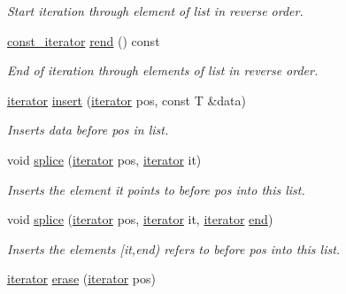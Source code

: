 \begin{DoxyCompactItemize}
\begin{DoxyCompactList}\small\item\em Start iteration through element of list in reverse order. \end{DoxyCompactList}\item 
\mbox{\hyperlink{classsymlist_af15c0ca931299054f83d17a1580a5159}{const\+\_\+iterator}} \mbox{\hyperlink{classsymlist_a42379ebaa07ddb1160d785fec701712d}{rend}} () const
\begin{DoxyCompactList}\small\item\em End of iteration through elements of list in reverse order. \end{DoxyCompactList}\item 
\mbox{\hyperlink{classsymlist_a66045fbe3d98975e5537092ede8b50df}{iterator}} \mbox{\hyperlink{classsymlist_a8b3327b8a33b180bf1eb802856f755c3}{insert}} (\mbox{\hyperlink{classsymlist_a66045fbe3d98975e5537092ede8b50df}{iterator}} pos, const T \&data)
\begin{DoxyCompactList}\small\item\em Inserts {\ttfamily data} before {\ttfamily pos} in list. \end{DoxyCompactList}\item 
void \mbox{\hyperlink{classsymlist_ac2bd4d9db62ea6a3282662c62a97c3b2}{splice}} (\mbox{\hyperlink{classsymlist_a66045fbe3d98975e5537092ede8b50df}{iterator}} pos, \mbox{\hyperlink{classsymlist_a66045fbe3d98975e5537092ede8b50df}{iterator}} it)
\begin{DoxyCompactList}\small\item\em Inserts the element {\ttfamily it} points to before {\ttfamily pos} into this list. \end{DoxyCompactList}\item 
void \mbox{\hyperlink{classsymlist_a27889c85e97c1e8dec7a871987a12b29}{splice}} (\mbox{\hyperlink{classsymlist_a66045fbe3d98975e5537092ede8b50df}{iterator}} pos, \mbox{\hyperlink{classsymlist_a66045fbe3d98975e5537092ede8b50df}{iterator}} it, \mbox{\hyperlink{classsymlist_a66045fbe3d98975e5537092ede8b50df}{iterator}} \mbox{\hyperlink{classsymlist_a7283589fa01f79d722f8256d7a6a7883}{end}})
\begin{DoxyCompactList}\small\item\em Inserts the elements {\ttfamily \mbox{[}it,end)} refers to before {\ttfamily pos} into this list. \end{DoxyCompactList}\item 
\mbox{\hyperlink{classsymlist_a66045fbe3d98975e5537092ede8b50df}{iterator}} \mbox{\hyperlink{classsymlist_a75fc1fc7db7b20cc430ddb8577608904}{erase}} (\mbox{\hyperlink{classsymlist_a66045fbe3d98975e5537092ede8b50df}{iterator}} pos)

\end{DoxyCompactItemize}
